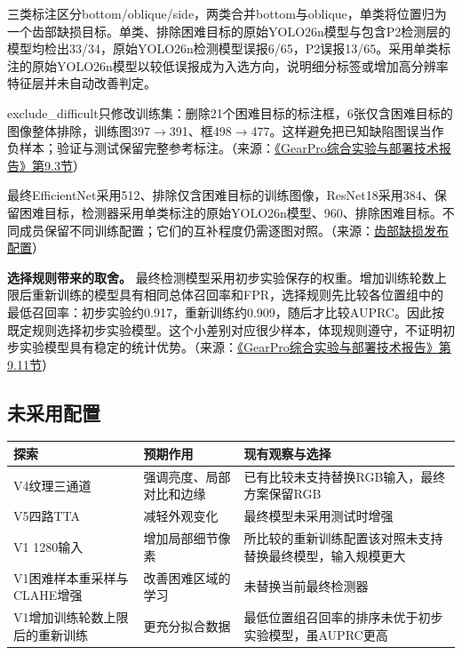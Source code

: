 三类标注区分bottom/oblique/side，两类合并bottom与oblique，单类将位置归为一个齿部缺损目标。单类、排除困难目标的原始YOLO26n模型与包含P2检测层的模型均检出33/34，原始YOLO26n检测模型误报6/65，P2误报13/65。采用单类标注的原始YOLO26n模型以较低误报成为入选方向，说明细分标签或增加高分辨率特征层并未自动改善判定。

exclude\_difficult只修改训练集：删除21个困难目标的标注框，6张仅含困难目标的图像整体排除，训练图397\ensuremath{\rightarrow}391、框498\ensuremath{\rightarrow}477。这样避免把已知缺陷图误当作负样本；验证与测试保留完整参考标注。（来源：\protect\href{run:../GearPro_综合技术报告_Markdown含配图/GearPro_综合实验与部署技术报告.md}{《GearPro综合实验与部署技术报告》第9.3节}）

最终EfficientNet采用512、排除仅含困难目标的训练图像，ResNet18采用384、保留困难目标，检测器采用单类标注的原始YOLO26n模型、960、排除困难目标。不同成员保留不同训练配置；它们的互补程度仍需逐图对照。（来源：\protect\hyperlink{source-2}{齿部缺损发布配置}）

\textbf{选择规则带来的取舍。} 最终检测模型采用初步实验保存的权重。增加训练轮数上限后重新训练的模型具有相同总体召回率和FPR，选择规则先比较各位置组中的最低召回率：初步实验约0.917，重新训练约0.909，随后才比较AUPRC。因此按既定规则选择初步实验模型。这个小差别对应很少样本，体现规则遵守，不证明初步实验模型具有稳定的统计优势。（来源：\protect\href{run:../GearPro_综合技术报告_Markdown含配图/GearPro_综合实验与部署技术报告.md}{《GearPro综合实验与部署技术报告》第9.11节}）

\FloatBarrier{}\subsection{未采用配置}

\par\medskip\noindent\begin{minipage}{\linewidth}\small{}
\begin{tabular}{@{}>{\raggedright\arraybackslash}p{0.240\dimexpr\linewidth-4\tabcolsep\relax}>{\raggedright\arraybackslash}p{0.340\dimexpr\linewidth-4\tabcolsep\relax}>{\raggedright\arraybackslash}p{0.420\dimexpr\linewidth-4\tabcolsep\relax}@{}}
\toprule
探索 & 预期作用 & 现有观察与选择 \\
\midrule
V4纹理三通道 & 强调亮度、局部对比和边缘 & 已有比较未支持替换RGB输入，最终方案保留RGB \\
V5四路TTA & 减轻外观变化 & 最终模型未采用测试时增强 \\
V1 1280输入 & 增加局部细节像素 & 所比较的重新训练配置该对照未支持替换最终模型，输入规模更大 \\
V1困难样本重采样与CLAHE增强 & 改善困难区域的学习 & 未替换当前最终检测器 \\
V1增加训练轮数上限后的重新训练 & 更充分拟合数据 & 最低位置组召回率的排序未优于初步实验模型，虽AUPRC更高 \\
\bottomrule\end{tabular}\end{minipage}\par\medskip


